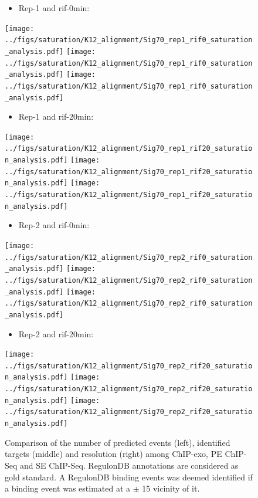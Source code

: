 \documentclass{bmcart}\usepackage[]{graphicx}\usepackage[]{color}
\begin{document}
\newpage

\begin{figure}[h!] %
  \centering
  \begin{itemize}
  \item Rep-1 and rif-0min:
  \end{itemize}
  \texttt{[image: ../figs/saturation/K12\_alignment/Sig70\_rep1\_rif0\_saturation\_analysis.pdf]}
  \texttt{[image: ../figs/saturation/K12\_alignment/Sig70\_rep1\_rif0\_saturation\_analysis.pdf]}
  \texttt{[image: ../figs/saturation/K12\_alignment/Sig70\_rep1\_rif0\_saturation\_analysis.pdf]}

  \begin{itemize}
  \item Rep-1 and rif-20min:
  \end{itemize}

  \texttt{[image: ../figs/saturation/K12\_alignment/Sig70\_rep1\_rif20\_saturation\_analysis.pdf]}
  \texttt{[image: ../figs/saturation/K12\_alignment/Sig70\_rep1\_rif20\_saturation\_analysis.pdf]}
  \texttt{[image: ../figs/saturation/K12\_alignment/Sig70\_rep1\_rif20\_saturation\_analysis.pdf]}

  \begin{itemize}
  \item Rep-2 and rif-0min:
  \end{itemize}

  \texttt{[image: ../figs/saturation/K12\_alignment/Sig70\_rep2\_rif0\_saturation\_analysis.pdf]}
  \texttt{[image: ../figs/saturation/K12\_alignment/Sig70\_rep2\_rif0\_saturation\_analysis.pdf]}
  \texttt{[image: ../figs/saturation/K12\_alignment/Sig70\_rep2\_rif0\_saturation\_analysis.pdf]}

  \begin{itemize}
  \item Rep-2 and rif-20min:
  \end{itemize}

  \texttt{[image: ../figs/saturation/K12\_alignment/Sig70\_rep2\_rif20\_saturation\_analysis.pdf]}
  \texttt{[image: ../figs/saturation/K12\_alignment/Sig70\_rep2\_rif20\_saturation\_analysis.pdf]}
  \texttt{[image: ../figs/saturation/K12\_alignment/Sig70\_rep2\_rif20\_saturation\_analysis.pdf]}
  \caption{Comparison of the number of predicted events (left),
    identified targets (middle) and resolution (right) among ChIP-exo,
    PE ChIP-Seq and SE ChIP-Seq. RegulonDB annotations are considered
    as gold standard. A RegulonDB binding events was deemed identified
    if a binding event was estimated at a $\pm$ 15 vicinity
    of it.}
  \label{fig:saturation_rif}
\end{figure}
\end{document}
